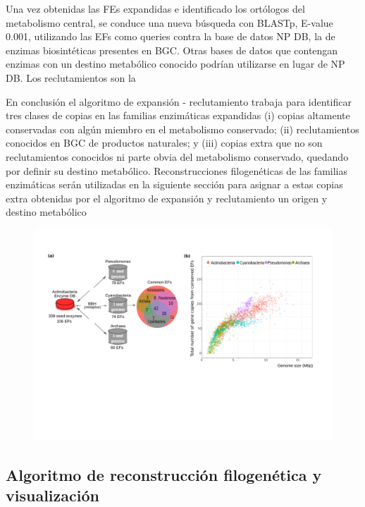 \documentclass[12pt,twoside]{reedthesis}
\begin{document}
  Una vez obtenidas las FEs expandidas e identificado los ortólogos del
  metabolismo central, se conduce una nueva búsqueda con BLASTp, E-value
  0.001, utilizando las EFs como queries contra la base de datos NP DB, la
  de enzimas biosintéticas presentes en BGC. Otras bases de datos que
  contengan enzimas con un destino metabólico conocido podrían utilizarse
  en lugar de NP DB. Los reclutamientos son la
  
  En conclusión el algoritmo de expansión - reclutamiento trabaja para
  identificar tres clases de copias en las familias enzimáticas expandidas
  (i) copias altamente conservadas con algún miembro en el metabolismo
  conservado; (ii) reclutamientos conocidos en BGC de productos naturales;
  y (iii) copias extra que no son reclutamientos conocidos ni parte obvia
  del metabolismo conservado, quedando por definir su destino metabólico.
  Reconstrucciones filogenéticas de las familias enzimáticas serán
  utilizadas en la siguiente sección para asignar a estas copias extra
  obtenidas por el algoritmo de expansión y reclutamiento un origen y
  destino metabólico
  
  \begin{figure}[h!tbp]
  \centering
  \includegraphics[angle = 0,scale = .6]{chapter2/FigurasPaper/Figure2.pdf}
  \caption[Seed genomes]{\footnotesize{}}
  \label{fig:SeedGenomes}
  \end{figure}
  
  \subsection{Algoritmo de reconstrucción filogenética y
  visualización}\label{algoritmo-de-reconstruccion-filogenetica-y-visualizacion}
  
\end{document}
